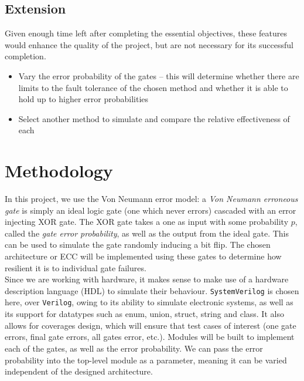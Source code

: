 \documentclass[12pt,a4paper]{article}
\begin{document}
\subsection{Extension}
Given enough time left after completing the essential objectives, these features would enhance the quality of the 
project, but are not necessary for its successful completion.
\begin{itemize}
    \item Vary the error probability of the gates -- this will determine whether there are limits to the fault 
    tolerance of the chosen method and whether it is able to hold up to higher error probabilities
    \item Select another method to simulate and compare the relative effectiveness of each
\end{itemize}


\section{Methodology} \label{sec:meth}
In this project, we use the Von Neumann error model: a \emph{Von Neumann erroneous gate} is simply an ideal logic 
gate (one which never errors) cascaded with an error injecting XOR gate. The XOR gate takes a one as input with some 
probability $p$, called the \emph{gate error probability}, as well as the output from the ideal gate. This can be 
used to simulate the gate randomly inducing a bit flip. The chosen architecture or ECC will be implemented using 
these gates to determine how resilient it is to individual gate failures. \\

\noindent Since we are working with hardware, it makes sense to make use of a hardware description language (HDL) to 
simulate their behaviour. \texttt{SystemVerilog} is chosen here, over \texttt{Verilog}, owing to its ability to 
simulate electronic systems, as well as its support for datatypes such as enum, union, struct, string and class. It 
also allows for coverages design, which will ensure that test cases of interest (one gate errors, final gate errors, 
all gates error, etc.). Modules will be built to implement each of the gates, as well as the error probability. We 
can pass the error probability into the top-level module as a parameter, meaning it can be varied independent of the 
designed architecture. \\
\end{document}

